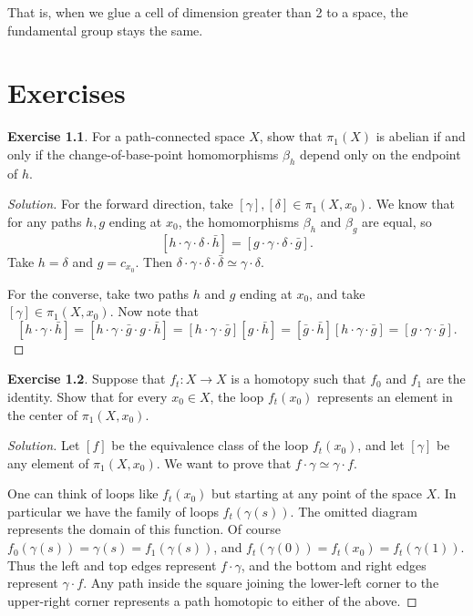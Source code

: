 \documentclass{book}
\theoremstyle{definition}
\newtheorem*{ejer}{Exercise}
\begin{document}
That is, when we glue a cell of dimension greater than 2 to
a space, the fundamental group stays the same.

\chapter{Exercises}

\begin{ejer}
For a path-connected space $X$, show that $\pi_1(X)$ is
abelian if and only if the change-of-base-point
homomorphisms $\beta_h$ depend only on the endpoint of $h$.
\end{ejer}

\begin{proof}[Solution]
For the forward direction, take
$[\gamma],[\delta]\in\pi_1(X,x_0)$. We know that for any
paths $h,g$ ending at $x_0$, the homomorphisms $\beta_h$ and
$\beta_g$ are equal, so
$$
[h\cdot \gamma\cdot\delta\cdot\bar h]
=
[g\cdot\gamma\cdot\delta\cdot\bar g].
$$
Take $h=\delta$ and $g=c_{x_0}$. Then
$\delta\cdot\gamma\cdot\delta\cdot\bar\delta
\simeq\gamma\cdot\delta$.

For the converse, take two paths $h$ and $g$ ending at
$x_0$, and take $[\gamma]\in\pi_1(X,x_0)$. Now note that
$$
[h\cdot\gamma\cdot\bar h]
=[h\cdot\gamma\cdot \bar g\cdot g\cdot\bar h]
=[h\cdot\gamma\cdot \bar g][g\cdot\bar h]
=[\bar g\cdot\bar h][h\cdot\gamma\cdot \bar g]
=[g\cdot\gamma\cdot \bar g].
$$
\end{proof}

\begin{ejer}
Suppose that $f_t:X\to X$ is a homotopy such that $f_0$ and
$f_1$ are the identity. Show that for every $x_0\in X$, the
loop $f_t(x_0)$ represents an element in the center of
$\pi_1(X,x_0)$.
\end{ejer}

\begin{proof}[Solution]
Let $[f]$ be the equivalence class of the loop $f_t(x_0)$,
and let $[\gamma]$ be any element of $\pi_1(X,x_0)$. We want
to prove that $f\cdot\gamma\simeq\gamma\cdot f$.

One can think of loops like $f_t(x_0)$ but starting at any
point of the space $X$. In particular we have the family of
loops $f_t(\gamma(s))$. The omitted diagram represents the
domain of this function. Of course
$f_0(\gamma(s))=\gamma(s)=f_1(\gamma(s))$, and
$f_t(\gamma(0))=f_t(x_0)=f_t(\gamma(1))$. Thus the left and
top edges represent $f\cdot\gamma$, and the bottom and right
edges represent $\gamma\cdot f$. Any path inside the square
joining the lower-left corner to the upper-right corner
represents a path homotopic to either of the above.
\end{proof}
\end{document}
